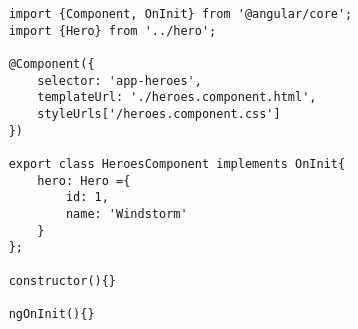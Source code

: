 \begin{lstlisting}
    import {Component, OnInit} from '@angular/core';
    import {Hero} from '../hero';

    @Component({
        selector: 'app-heroes',
        templateUrl: './heroes.component.html',
        styleUrls['/heroes.component.css']
    })

    export class HeroesComponent implements OnInit{
        hero: Hero ={
            id: 1,
            name: 'Windstorm'
        }
    };

    constructor(){}

    ngOnInit(){}
\end{lstlisting}